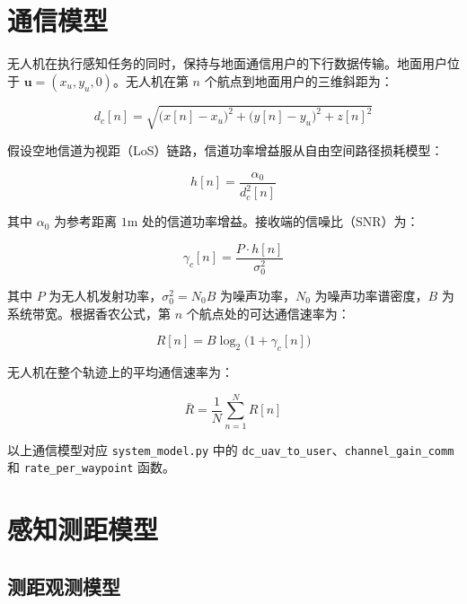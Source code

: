 \section{通信模型}

无人机在执行感知任务的同时，保持与地面通信用户的下行数据传输。地面用户位于 $\mathbf{u}=(x_u, y_u, 0)$。无人机在第 $n$ 个航点到地面用户的三维斜距为：

\begin{equation}
d_c[n]=\sqrt{\bigl(x[n]-x_u\bigr)^2+\bigl(y[n]-y_u\bigr)^2+z[n]^2}
\label{eq:dc_distance}
\end{equation}

假设空地信道为视距（LoS）链路，信道功率增益服从自由空间路径损耗模型：

\begin{equation}
h[n]=\frac{\alpha_0}{d_c^2[n]}
\label{eq:channel_gain_comm}
\end{equation}

其中 $\alpha_0$ 为参考距离 $1\text{m}$ 处的信道功率增益。接收端的信噪比（SNR）为：

\begin{equation}
\gamma_c[n]=\frac{P\cdot h[n]}{\sigma_0^2}
\label{eq:snr_comm}
\end{equation}

其中 $P$ 为无人机发射功率，$\sigma_0^2=N_0B$ 为噪声功率，$N_0$ 为噪声功率谱密度，$B$ 为系统带宽。根据香农公式，第 $n$ 个航点处的可达通信速率为：

\begin{equation}
R[n]=B\log_2\!\bigl(1+\gamma_c[n]\bigr)
\label{eq:rate_per_waypoint}
\end{equation}

无人机在整个轨迹上的平均通信速率为：

\begin{equation}
\bar{R}=\frac{1}{N}\sum_{n=1}^{N}R[n]
\label{eq:average_rate}
\end{equation}

以上通信模型对应 \texttt{system\_model.py} 中的 \texttt{dc\_uav\_to\_user}、\texttt{channel\_gain\_comm} 和 \texttt{rate\_per\_waypoint} 函数。

\section{感知测距模型}

\subsection{测距观测模型}

